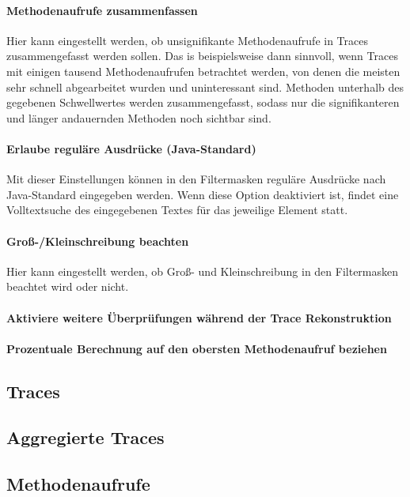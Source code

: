 \documentclass{article}
\begin{document}
  \paragraph{Methodenaufrufe zusammenfassen}
  Hier kann eingestellt werden, ob unsignifikante Methodenaufrufe in Traces zusammengefasst werden sollen.
  Das is beispielsweise dann sinnvoll, wenn Traces mit einigen tausend Methodenaufrufen betrachtet werden, von denen die meisten sehr schnell abgearbeitet wurden und uninteressant sind.  
  Methoden unterhalb des gegebenen Schwellwertes werden zusammengefasst, sodass nur die signifikanteren und länger andauernden Methoden noch sichtbar sind.

  \paragraph{Erlaube reguläre Ausdrücke (Java-Standard)}
  Mit dieser Einstellungen können in den Filtermasken reguläre Ausdrücke nach Java-Standard eingegeben werden.
  Wenn diese Option deaktiviert ist, findet eine Volltextsuche des eingegebenen Textes für das jeweilige Element statt.

  \paragraph{Groß-/Kleinschreibung beachten}
  Hier kann eingestellt werden, ob Groß- und Kleinschreibung in den Filtermasken beachtet wird oder nicht.

  \paragraph{Aktiviere weitere Überprüfungen während der Trace Rekonstruktion}

  \paragraph{Prozentuale Berechnung auf den obersten Methodenaufruf beziehen}

  \subsection{Traces}
  \subsection{Aggregierte Traces}
  \subsection{Methodenaufrufe}
\end{document}
